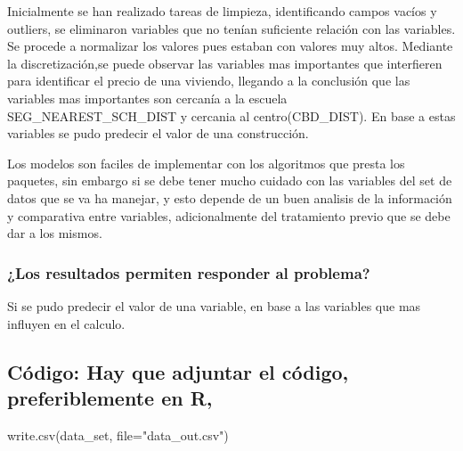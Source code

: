 \documentclass[
]{article}
\newenvironment{Shaded}{\begin{snugshade}}{\end{snugshade}}
\newcommand{\AttributeTok}[1]{\textcolor[rgb]{0.77,0.63,0.00}{#1}}
\newcommand{\FunctionTok}[1]{\textcolor[rgb]{0.00,0.00,0.00}{#1}}
\newcommand{\NormalTok}[1]{#1}
\newcommand{\StringTok}[1]{\textcolor[rgb]{0.31,0.60,0.02}{#1}}
\begin{document}
Inicialmente se han realizado tareas de limpieza, identificando campos
vacíos y outliers, se eliminaron variables que no tenían suficiente
relación con las variables. Se procede a normalizar los valores pues
estaban con valores muy altos. Mediante la discretización,se puede
observar las variables mas importantes que interfieren para identificar
el precio de una viviendo, llegando a la conclusión que las variables
mas importantes son cercanía a la escuela SEG\_NEAREST\_SCH\_DIST y
cercania al centro(CBD\_DIST). En base a estas variables se pudo
predecir el valor de una construcción.

Los modelos son faciles de implementar con los algoritmos que presta los
paquetes, sin embargo si se debe tener mucho cuidado con las variables
del set de datos que se va ha manejar, y esto depende de un buen
analisis de la información y comparativa entre variables, adicionalmente
del tratamiento previo que se debe dar a los mismos.

\hypertarget{los-resultados-permiten-responder-al-problema}{%
\subsubsection{¿Los resultados permiten responder al
problema?}\label{los-resultados-permiten-responder-al-problema}}

Si se pudo predecir el valor de una variable, en base a las variables
que mas influyen en el calculo.

\hypertarget{cuxf3digo-hay-que-adjuntar-el-cuxf3digo-preferiblemente-en-r}{%
\subsection{Código: Hay que adjuntar el código, preferiblemente en
R,}\label{cuxf3digo-hay-que-adjuntar-el-cuxf3digo-preferiblemente-en-r}}

\begin{Shaded}
\begin{Highlighting}[]
\FunctionTok{write.csv}\NormalTok{(data\_set, }\AttributeTok{file=}\StringTok{"data\_out.csv"}\NormalTok{)}
\end{Highlighting}
\end{Shaded}
\end{document}
